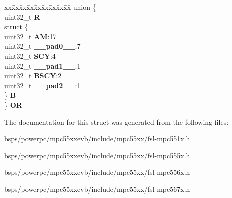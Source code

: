\begin{DoxyCompactItemize}
\begin{tabbing}
\end{tabbing}\item 
\mbox{\label{structEBI__CAL__CS__tag_acbde576dd6bb942adaa33adc3c82e3f5}} 
\begin{tabbing}
xx\=xx\=xx\=xx\=xx\=xx\=xx\=xx\=xx\=\kill
union \{\\
\>uint32\_t {\bfseries R}\\
\>struct \{\\
\>\>uint32\_t {\bfseries AM}:17\\
\>\>uint32\_t {\bfseries \_\_pad0\_\_}:7\\
\>\>uint32\_t {\bfseries SCY}:4\\
\>\>uint32\_t {\bfseries \_\_pad1\_\_}:1\\
\>\>uint32\_t {\bfseries BSCY}:2\\
\>\>uint32\_t {\bfseries \_\_pad2\_\_}:1\\
\>\} {\bfseries B}\\
\} {\bfseries OR}\\

\end{tabbing}\end{DoxyCompactItemize}


The documentation for this struct was generated from the following files\+:\begin{DoxyCompactItemize}
\item 
bsps/powerpc/mpc55xxevb/include/mpc55xx/fsl-\/mpc551x.\+h\item 
bsps/powerpc/mpc55xxevb/include/mpc55xx/fsl-\/mpc555x.\+h\item 
bsps/powerpc/mpc55xxevb/include/mpc55xx/fsl-\/mpc556x.\+h\item 
bsps/powerpc/mpc55xxevb/include/mpc55xx/fsl-\/mpc567x.\+h\end{DoxyCompactItemize}
